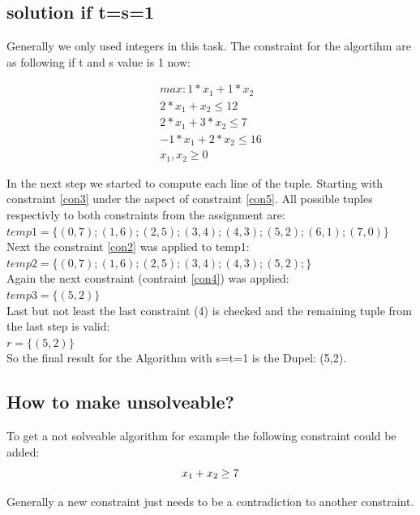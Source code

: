 \documentclass[%
   10pt,              %
   nenglish,           %
   a4paper,           %
   DIV11,             %
]{scrartcl}%
\begin{document}
\subsection*{solution if t=s=1}
Generally we only used integers in this task. The constraint for the algortihm are as following if t and s value is 1 now:

\begin{eqnarray}
max: 1*x_1+1*x_2 \label{con1}\\ 
2*x_1+x_2 \le 12 \label{con2}\\ 
2*x_1+3*x_2 \le 7 \label{con3}\\ 
-1*x_1+2*x_2 \le 16 \label{con4}\\ 
x_1,x_2 \ge 0 \label{con5}
\end{eqnarray}

In the next step we started to compute each line of the tuple. Starting with constraint \ref{con3} under the aspect of constraint \ref{con5}. All possible tuples respectivly to both constraints from the assignment are:\\
$temp1=\{(0,7);(1,6);(2,5);(3,4);(4,3);(5,2);(6,1);(7,0)\}$\\

Next the constraint \ref{con2} was applied to temp1:\\
$temp2=\{(0,7);(1,6);(2,5);(3,4);(4,3);(5,2);\}$\\

Again the next constraint (contraint \ref{con4}) was applied:\\
$temp3=\{(5,2)\}$\\

Last but not least the last constraint (4) is checked and the remaining tuple from the last step is valid:\\
$r=\{(5,2)\}$\\

So the final result for the Algorithm with s=t=1 is the Dupel: (5,2).\\


\subsection*{How to make unsolveable?}
To get a not solveable algorithm for example the following constraint could be added:
	\begin{equation}\\
		x_1+x_2\ge 7
	\end{equation}

Generally a new constraint just needs to be a contradiction to another constraint.
	
\end{document}
